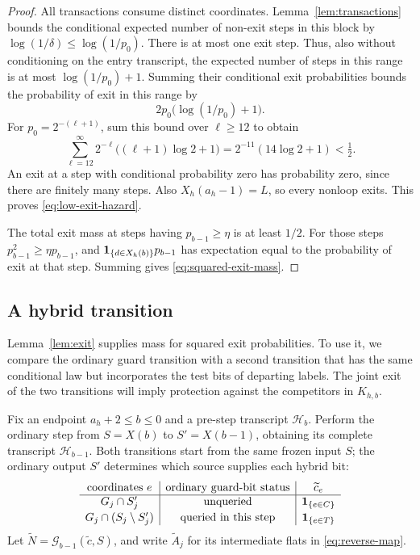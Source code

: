 \begin{proof}
All transactions consume distinct coordinates. Lemma~\ref{lem:transactions}
bounds the conditional expected number of non-exit steps in this block
by $\log(1/\delta)\le\log(1/p_0)$. There is at most one exit step. Thus,
also without conditioning on the entry transcript, the expected number
of steps in this range is at most $\log(1/p_0)+1$. Summing their
conditional exit probabilities bounds the probability of exit in this
range by
\[
 2p_0\bigl(\log(1/p_0)+1\bigr).
\]
For $p_0=2^{-(\ell+1)}$, sum this bound over $\ell\ge12$ to obtain
\begin{equation}\label{eq:dyadic-exit}
 \sum_{\ell=12}^{\infty}
   2^{-\ell}\bigl((\ell+1)\log2+1\bigr)
   =2^{-11}(14\log2+1)<\tfrac12.
\end{equation}
An exit at a step with conditional probability zero has probability
zero, since there are finitely many steps. Also $X_h(a_h-1)=L$, so every
nonloop exits. This proves \eqref{eq:low-exit-hazard}.

The total exit mass at steps having $p_{b-1}\ge\eta$ is at least $1/2$.
For those steps $p_{b-1}^{2}\ge\eta p_{b-1}$, and
$\mathbf 1_{\{d\in X_h(b)\}}p_{b-1}$ has expectation equal to the probability of
exit at that step. Summing gives \eqref{eq:squared-exit-mass}.
\end{proof}

\subsection{A hybrid transition}

Lemma~\ref{lem:exit} supplies mass for squared exit probabilities.
To use it, we compare the ordinary guard transition with a second
transition that has the same conditional law but incorporates the test
bits of departing labels. The joint exit of the two transitions will
imply protection against the competitors in $K_{h,b}$.

Fix an endpoint $a_h+2\le b\le0$ and a pre-step transcript
$\mathcal H_b$. Perform the ordinary step from $S=X(b)$ to
$S'=X(b-1)$, obtaining its complete transcript $\mathcal H_{b-1}$.
Both transitions start from the same frozen input $S$; the ordinary
output $S'$ determines which source supplies each hybrid bit:
\begin{equation}\label{eq:hybrid-bits}
 \begin{array}{c|c|c}
  \text{coordinates }e & \text{ordinary guard-bit status}
                    & \widetilde c_e\\ \hline
  G_j\cap S'_j & \text{unqueried} & \mathbf 1_{\{e\in C\}}\\[2pt]
  G_j\cap(S_j\setminus S'_j) & \text{queried in this step}
                    & \mathbf 1_{\{e\in T\}}
 \end{array}
\end{equation}
Let $\widetilde N=\mathcal G_{b-1}(\widetilde c,S)$, and write
$\widetilde A_j$ for its intermediate flats in
\eqref{eq:reverse-map}.


